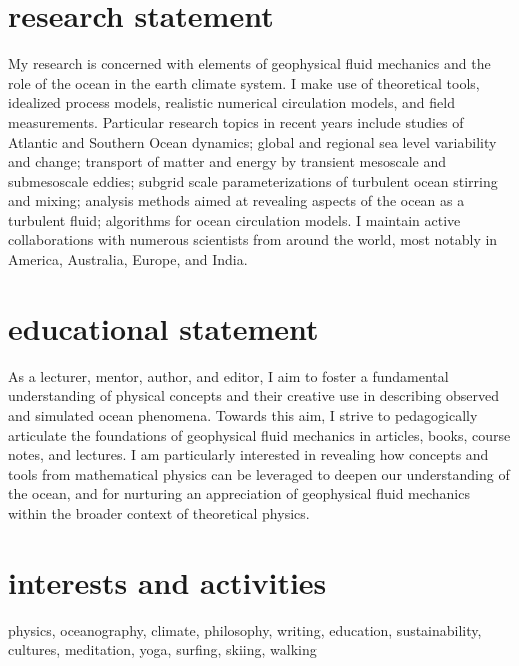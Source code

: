 \documentclass{article}
\begin{document}
\section*{\sc \color{Maroon}  research statement}
\vspace{-.3cm}
My research is concerned with elements of geophysical fluid mechanics and the role of the ocean in the earth climate system. I make use of theoretical tools, idealized process models, realistic numerical circulation models, and field measurements.
Particular research topics in recent years include studies of  Atlantic and Southern Ocean dynamics; global and regional sea level variability and change;  transport of matter and energy by transient mesoscale and submesoscale eddies; subgrid scale parameterizations of turbulent ocean stirring and mixing; analysis methods aimed at revealing aspects of the ocean as a turbulent fluid; algorithms for ocean circulation models. 
I maintain active collaborations with numerous scientists from around the world, most notably in America, Australia, Europe, and India. 

\section*{\sc \color{Maroon} educational statement}
\vspace{-.3cm}
As a lecturer, mentor, author, and editor, I aim to foster a fundamental understanding of physical concepts and their creative use in describing observed and simulated ocean phenomena. Towards this aim, I strive to pedagogically articulate the foundations of geophysical fluid mechanics in articles, books, course notes, and lectures.  I am particularly interested in revealing how concepts and tools from mathematical physics can be leveraged to deepen our understanding of the ocean, and for nurturing an appreciation of geophysical fluid mechanics within the broader context of theoretical physics. 

\section*{\sc  \color{Maroon}  interests and activities}
\vspace{-.25cm}

physics, oceanography, climate, philosophy, writing, education, sustainability, cultures, meditation, yoga, surfing, skiing, walking
\end{document}
